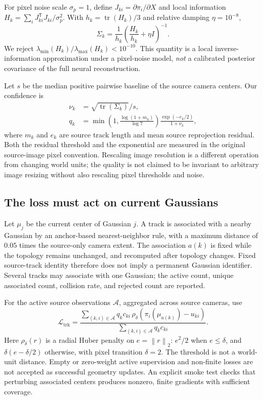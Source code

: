 \documentclass[10pt,twocolumn,letterpaper]{article}
\newcommand{\norm}[1]{\left\lVert#1\right\rVert}
\newcommand{\cL}{\mathcal{L}}
\begin{document}
For pixel noise scale $\sigma_p=1$, define $J_{ki}=\partial\pi_i/\partial X$ and local information $H_k=\sum_i J_{ki}^{\mathsf T}J_{ki}/\sigma_p^2$. With $h_k=\operatorname{tr}(H_k)/3$ and relative damping $\eta=10^{-8}$,
\begin{equation}
\Sigma_k=\frac{1}{h_k}\left(\frac{H_k}{h_k}+\eta I\right)^{-1}.
\label{eq:covariance}
\end{equation}
We reject $\lambda_{\min}(H_k)/\lambda_{\max}(H_k)<10^{-10}$. This quantity is a local inverse-information approximation under a pixel-noise model, \emph{not} a calibrated posterior covariance of the full neural reconstruction.

Let $s$ be the median positive pairwise baseline of the source camera centers. Our confidence is
\begin{align}
\nu_k&=\sqrt{\operatorname{tr}(\Sigma_k)}/s,\\
q_k&=\min\!\left(1,\frac{\log(1+m_k)}{\log 7}\right)
\frac{\exp(-e_k/2)}{1+\nu_k},
\label{eq:quality}
\end{align}
where $m_k$ and $e_k$ are source track length and mean source reprojection residual. Both the residual threshold and the exponential are measured in the original source-image pixel convention. Rescaling image resolution is a different operation from changing world units; the quality is not claimed to be invariant to arbitrary image resizing without also rescaling pixel thresholds and noise.

\subsection{The loss must act on current Gaussians}
Let $\mu_j$ be the current center of Gaussian $j$. A track is associated with a nearby Gaussian by an anchor-based nearest-neighbor rule, with a maximum distance of $0.05$ times the source-only camera extent. The association $a(k)$ is fixed while the topology remains unchanged, and recomputed after topology changes. Fixed source-track identity therefore does not imply a permanent Gaussian identifier. Several tracks may associate with one Gaussian; the active count, unique associated count, collision rate, and rejected count are reported.

For the active source observations $\mathcal A$, aggregated across source cameras, use
\begin{equation}
\cL_{\mathrm{trk}}=
\frac{\sum_{(k,i)\in\mathcal A}q_kc_{ki}\,
\rho_\delta(\pi_i(\mu_{a(k)})-u_{ki})}
{\sum_{(k,i)\in\mathcal A}q_kc_{ki}}.
\label{eq:trackloss}
\end{equation}
Here $\rho_\delta(r)$ is a radial Huber penalty on $e=\norm{r}_2$: $e^2/2$ when $e\leq\delta$, and $\delta(e-\delta/2)$ otherwise, with pixel transition $\delta=2$. The threshold is not a world-unit distance. Empty or zero-weight active supervision and non-finite losses are not accepted as successful geometry updates. An explicit smoke test checks that perturbing associated centers produces nonzero, finite gradients with sufficient coverage.
\end{document}
